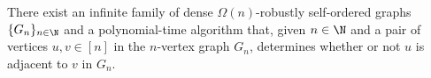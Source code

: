 \setcounter{theorem}{3}
\label{dense:ithm} 
There exist an infinite family
of dense $\Omega(n)$-robustly self-ordered graphs $\{G_n\}_{n\in\N}$
and a polynomial-time algorithm that,
given $n\in\N$ and a pair of vertices $u,v\in[n]$
in the $n$-vertex graph $G_n$,
determines whether or not $u$ is adjacent to $v$ in $G_n$.
\ET








































































































